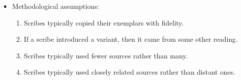 \documentclass[10pt]{beamer}
\begin{document}
	\begin{frame}
		\begin{itemize}
			\item Methodological assumptions:
			\begin{enumerate}
				\item Scribes typically copied their exemplars with fidelity.
				\item If a scribe introduced a variant, then it came from some other reading.
				\item Scribes typically used fewer sources rather than many.
				\item Scribes typically used closely related sources rather than distant ones.
			\end{enumerate}
		\end{itemize}
	\end{frame}
\end{document}
